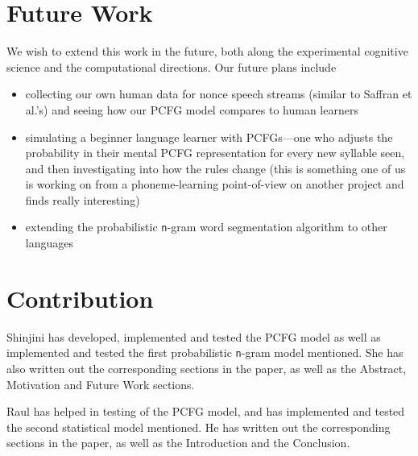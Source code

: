\documentclass{article}
\begin{document}
\section{Future Work}
\vspace{-1mm}
We wish to extend this work in the future, both along the experimental cognitive science and the computational directions. Our future plans include \begin{itemize}
    \item collecting our own human data for nonce speech streams (similar to Saffran et al.'s) and seeing how our PCFG model compares to human learners
    \item simulating a beginner language learner with PCFGs---one who adjusts the probability in their mental PCFG representation for every new syllable seen, and then investigating into how the rules change (this is something one of us is working on from a phoneme-learning point-of-view on another project and finds really interesting)
    \item extending the probabilistic \texttt{n}-gram word segmentation algorithm to other languages
\end{itemize}

\section{Contribution}
Shinjini has developed, implemented and tested the PCFG model as well as implemented and tested the first probabilistic \texttt{n}-gram model mentioned. She has also written out the corresponding sections in the paper, as well as the Abstract, Motivation and Future Work sections.

Raul has helped in testing of the PCFG model, and has implemented and tested the second statistical model mentioned. He has written out the corresponding sections in the paper, as well as the Introduction and the Conclusion.



\end{document}
